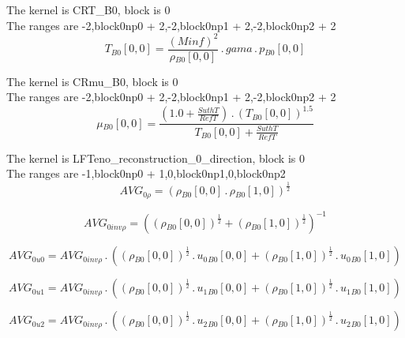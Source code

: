 \documentclass{article}
\begin{document}
\noindent The kernel is CRT_B0, block is 0\\\noindent The ranges are -2,block0np0 + 2,-2,block0np1 + 2,-2,block0np2 + 2\\\begin{dmath}{T{_{B0}}}[{0,0}] = \frac{\left(Minf \right)^{2}}{{\rho{_{B0}}}[{0,0}]} \,.\, gama \,.\, {p{_{B0}}}[{0,0}]\end{dmath}

\noindent The kernel is CRmu_B0, block is 0\\\noindent The ranges are -2,block0np0 + 2,-2,block0np1 + 2,-2,block0np2 + 2\\\begin{dmath}{\mu{_{B0}}}[{0,0}] = \frac{\left(1.0 + \frac{SuthT}{RefT}\right) \,.\, \left({T{_{B0}}}[{0,0}] \right)^{1.5}}{{T{_{B0}}}[{0,0}] + \frac{SuthT}{RefT}}\end{dmath}

\noindent The kernel is LFTeno_reconstruction_0_direction, block is 0\\\noindent The ranges are -1,block0np0 + 1,0,block0np1,0,block0np2\\\begin{dmath}AVG_{0 \rho} = \left({\rho{_{B0}}}[{0,0}] \,.\, {\rho{_{B0}}}[{1,0}] \right)^{\frac{1}{2}}\end{dmath}

\begin{dmath}AVG_{0 inv \rho} = \left(\left({\rho{_{B0}}}[{0,0}] \right)^{\frac{1}{2}} + \left({\rho{_{B0}}}[{1,0}] \right)^{\frac{1}{2}} \right)^{-1}\end{dmath}

\begin{dmath}AVG_{0 u0} = AVG_{0 inv \rho} \,.\, \left(\left({\rho{_{B0}}}[{0,0}] \right)^{\frac{1}{2}} \,.\, {u_{0}{_{B0}}}[{0,0}] + \left({\rho{_{B0}}}[{1,0}] \right)^{\frac{1}{2}} \,.\, {u_{0}{_{B0}}}[{1,0}]\right)\end{dmath}

\begin{dmath}AVG_{0 u1} = AVG_{0 inv \rho} \,.\, \left(\left({\rho{_{B0}}}[{0,0}] \right)^{\frac{1}{2}} \,.\, {u_{1}{_{B0}}}[{0,0}] + \left({\rho{_{B0}}}[{1,0}] \right)^{\frac{1}{2}} \,.\, {u_{1}{_{B0}}}[{1,0}]\right)\end{dmath}

\begin{dmath}AVG_{0 u2} = AVG_{0 inv \rho} \,.\, \left(\left({\rho{_{B0}}}[{0,0}] \right)^{\frac{1}{2}} \,.\, {u_{2}{_{B0}}}[{0,0}] + \left({\rho{_{B0}}}[{1,0}] \right)^{\frac{1}{2}} \,.\, {u_{2}{_{B0}}}[{1,0}]\right)\end{dmath}
\end{document}
